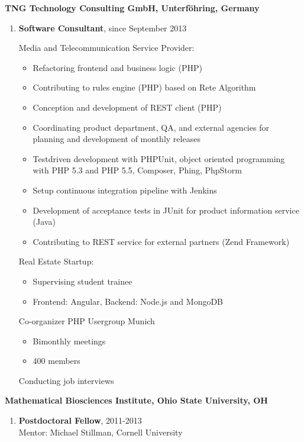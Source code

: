 \documentclass[10pt]{article}
\renewcommand{\section}[2]%
          {\pagebreak[2]\vspace{1.3\baselineskip}%
           \phantomsection\addcontentsline{toc}{section}{#1}%
           \hspace{-.05in}%
  	\marginpar{\raggedright \scshape #1} #2}
\newenvironment{outerlist}[1][\enskip\textbullet]%
          {\begin{enumerate}[#1]}{\end{enumerate}%
           \vspace{-.6\baselineskip}}
\begin{document}
  \section{} 
  \textbf{TNG Technology Consulting GmbH, Unterf\"ohring, Germany}
  \begin{outerlist}
  	\item[]
  	{\bf Software Consultant}, since September 2013

    Media and Telecommunication Service Provider:
    \begin{itemize}
      \item[] Refactoring frontend and business logic (PHP)
      \item[] Contributing to rules engine (PHP) based on Rete Algorithm
      \item[] Conception and development of REST client (PHP)
      \item[] Coordinating product department, QA, and external agencies for planning and development of monthly releases
      \item[] Testdriven development with PHPUnit, object oriented programming with PHP 5.3 and PHP 5.5, Composer, Phing, PhpStorm
      \item[] Setup continuous integration pipeline with Jenkins
      \item[] Development of acceptance tests in JUnit for product information service (Java)
      \item[] Contributing to REST service for external partners (Zend Framework)
    \end{itemize}

    Real Estate Startup:
      \begin{itemize}
      \item[] Supervising student trainee
      \item[] Frontend: Angular, Backend: Node.js and MongoDB
    \end{itemize}


    Co-organizer PHP Usergroup Munich
    \begin{itemize}
      \item[] Bimonthly meetings
      \item[] 400 members
    \end{itemize}

    Conducting job interviews\\

    \end{outerlist}

  \textbf{Mathematical Biosciences Institute, Ohio
  State University, OH}
  \begin{outerlist}
  	\item[]
  	{\bf Postdoctoral Fellow}, 2011-2013\\
  	Mentor: Michael Stillman, Cornell University
  	\\
  \end{outerlist}
  \begin{tabular*}{\textwidth}{c}
  \hline
  \end{tabular*}
\end{document}
